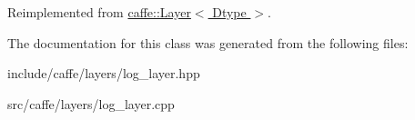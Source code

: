 Reimplemented from \hyperlink{classcaffe_1_1Layer_a38dc2488bf319b8de5a7ac84e0045393}{caffe\+::\+Layer$<$ Dtype $>$}.



The documentation for this class was generated from the following files\+:\begin{DoxyCompactItemize}
\item 
include/caffe/layers/log\+\_\+layer.\+hpp\item 
src/caffe/layers/log\+\_\+layer.\+cpp\end{DoxyCompactItemize}
